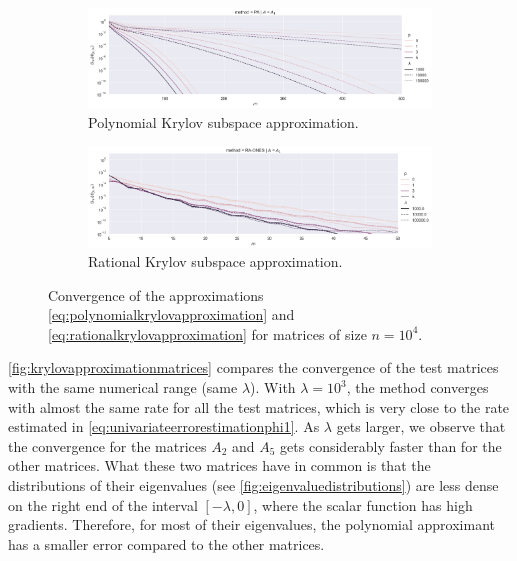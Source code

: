\begin{figure}[h]
    \centering
    \begin{subfigure}[b]{.9\textwidth}
        \includegraphics[width=\textwidth]{img/krylovapproximation/cnvg_ps_PA_n1e04.png}
        \caption{Polynomial Krylov subspace approximation.}
        \label{fig:polynomialkrylovapproximationevaluation}
    \end{subfigure}
    \vfill
    \begin{subfigure}[b]{.9\textwidth}
        \includegraphics[width=\textwidth]{img/krylovapproximation/cnvg_ps_RA-ONES_n1e04.png}
        \caption{Rational Krylov subspace approximation.}
        \label{fig:rationalkrylovapproximationevaluation}
    \end{subfigure}
    \caption{
        Convergence of the approximations \eqref{eq:polynomialkrylovapproximation}
        and \eqref{eq:rationalkrylovapproximation} for matrices of size $n=10^{4}$.
    }
    \label{fig:krylovapproximationevaluation}
\end{figure}

\autoref{fig:krylovapproximationmatrices} compares the convergence of the test matrices
with the same numerical range (same $\lambda$).
With $\lambda = 10^3$, the method converges with almost the same rate for all the test matrices,
which is very close to the rate estimated in \eqref{eq:univariateerrorestimationphi1}.
As $\lambda$ gets larger, we observe that the convergence for the matrices $A_2$ and $A_5$
gets considerably faster than for the other matrices.
What these two matrices have in common is that the distributions of their eigenvalues
(see \autoref{fig:eigenvaluedistributions}) are less dense on the right end of the
interval $[-\lambda, 0]$, where the scalar function has high gradients.
Therefore, for most of their eigenvalues, the polynomial approximant has a smaller error
compared to the other matrices.

